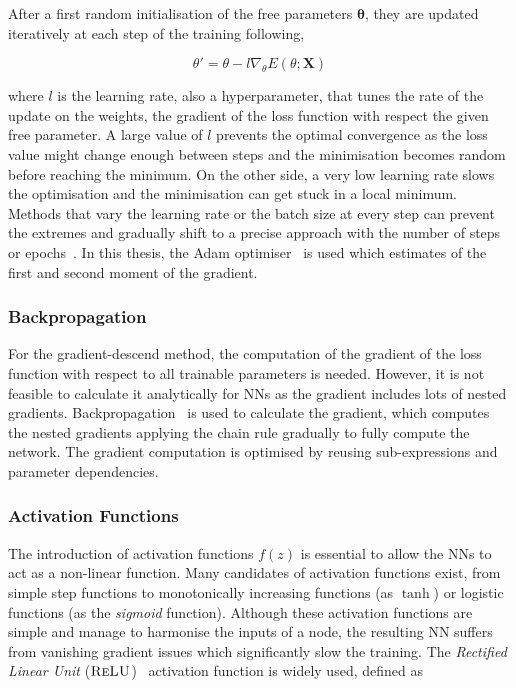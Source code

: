 After a first random initialisation of the free parameters $\boldsymbol{\theta}$, they are updated iteratively at each step of the training following,

\begin{equation}
    \theta' = \theta - l \nabla_\theta E(\theta;\mathbf{X})
\end{equation}

where $l$ is the learning rate, also a hyperparameter, that tunes the rate of the update on the weights, the gradient of the loss function with respect the given free parameter. A large value of $l$ prevents the optimal convergence as the loss value might change enough between steps and the minimisation becomes random before reaching the minimum. On the other side, a very low learning rate slows the optimisation and the minimisation can get stuck in a local minimum. Methods that vary the learning rate or the batch size at every step can prevent the extremes and gradually shift to a precise approach with the number of steps or epochs~\cite{LRBatchSize}. In this thesis, the Adam optimiser~\cite{Kingma2015AdamAM} is used which estimates of the first and second moment of the gradient.

\subsubsection{Backpropagation}

For the gradient-descend method, the computation of the gradient of the loss function with respect to all trainable parameters is needed. However, it is not feasible to calculate it analytically for NNs as the gradient includes lots of nested gradients. Backpropagation~\cite{Rumelhart1986} is used to calculate the gradient, which computes the nested gradients applying the chain rule gradually to fully compute the network. The gradient computation is optimised by reusing sub-expressions and parameter dependencies.

\subsubsection{Activation Functions}

The introduction of activation functions $f(z)$ is essential to allow the NNs to act as a non-linear function. Many candidates of activation functions exist, from simple step functions to monotonically increasing functions (as $\tanh$) or logistic functions (as the \textit{sigmoid} function). Although these activation functions are simple and manage to harmonise the inputs of a node, the resulting NN suffers from vanishing gradient issues which significantly slow the training. The \textit{Rectified Linear Unit} ($\textsc{ReLU}$)~\cite{relu} activation function is widely used, defined as

